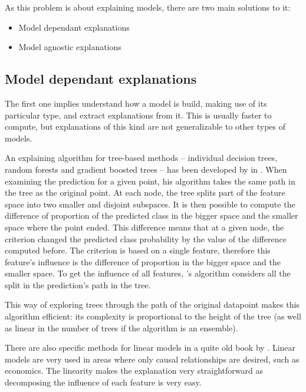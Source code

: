 \documentclass[a4paper]{article}
\begin{document}
As this problem is about explaining models, there are two main solutions to it:

\begin{itemize}
	\item Model dependant explanations
	\item Model agnostic explanations
\end{itemize}

\subsection{Model dependant explanations}

The first one implies understand how a model is build, making use of its particular type, and extract explanations from it. This is usually faster to compute, but explanations of this kind are not generalizable to other types of models.

An explaining algorithm for tree-based methods -- individual decision trees, random forests and gradient boosted trees -- has been developed by \citeauthor{treeinterpreter} in \cite{treeinterpreter}.
When examining the prediction for a given point, his algorithm takes the same path in the tree as the original point. At each node, the tree splits part of the feature space into two smaller and disjoint subspaces. It is then possible to compute the difference of proportion of the predicted class in the bigger space and the smaller space where the point ended. This difference means that at a given node, the criterion changed the predicted class probability by the value of the difference computed before. The criterion is based on a single feature, therefore this feature's influence is the difference of proportion in the bigger space and the smaller space. To get the influence of all features, \citeauthor{treeinterpreter}'s algorithm considers all the split in the prediction's path in the tree.

This way of exploring trees through the path of the original datapoint makes this algorithm efficient: its complexity is proportional to the height of the tree (as well as linear in the number of trees if the algorithm is an ensemble).

There are also specific methods for linear models in a quite old book \cite{interpretingusing} by \citeauthor{interpretingusing}. Linear models are very used in areas where only causal relationships are desired, such as economics. The linearity makes the explanation very straightforward as decomposing the influence of each feature is very easy.
\end{document}
